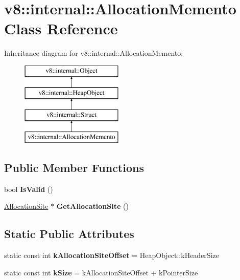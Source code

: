 \hypertarget{classv8_1_1internal_1_1_allocation_memento}{}\section{v8\+:\+:internal\+:\+:Allocation\+Memento Class Reference}
\label{classv8_1_1internal_1_1_allocation_memento}
Inheritance diagram for v8\+:\+:internal\+:\+:Allocation\+Memento\+:\begin{figure}[H]
\begin{center}
\leavevmode
\includegraphics[height=4.000000cm]{classv8_1_1internal_1_1_allocation_memento}
\end{center}
\end{figure}
\subsection*{Public Member Functions}
\begin{DoxyCompactItemize}
\item 
\hypertarget{classv8_1_1internal_1_1_allocation_memento_add097e221c27cfdae3cc58466d9decab}{}bool {\bfseries Is\+Valid} ()\label{classv8_1_1internal_1_1_allocation_memento_add097e221c27cfdae3cc58466d9decab}

\item 
\hypertarget{classv8_1_1internal_1_1_allocation_memento_a41f3677993cad4023761d6a0e4cf6df8}{}\hyperlink{classv8_1_1internal_1_1_allocation_site}{Allocation\+Site} $\ast$ {\bfseries Get\+Allocation\+Site} ()\label{classv8_1_1internal_1_1_allocation_memento_a41f3677993cad4023761d6a0e4cf6df8}

\end{DoxyCompactItemize}
\subsection*{Static Public Attributes}
\begin{DoxyCompactItemize}
\item 
\hypertarget{classv8_1_1internal_1_1_allocation_memento_ab07187e61f49dfb2c298a49b5aea49d7}{}static const int {\bfseries k\+Allocation\+Site\+Offset} = Heap\+Object\+::k\+Header\+Size\label{classv8_1_1internal_1_1_allocation_memento_ab07187e61f49dfb2c298a49b5aea49d7}

\item 
\hypertarget{classv8_1_1internal_1_1_allocation_memento_acf92166b75198263c67253249c64edf1}{}static const int {\bfseries k\+Size} = k\+Allocation\+Site\+Offset + k\+Pointer\+Size\label{classv8_1_1internal_1_1_allocation_memento_acf92166b75198263c67253249c64edf1}

\end{DoxyCompactItemize}
